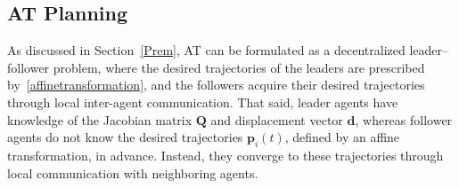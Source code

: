 \documentclass[journal]{IEEEtran}
\theoremstyle{definition}
\theoremstyle{plain}
\begin{document}
\subsection{AT Planning}\label{Affine Transformation Planning}
As discussed in Section~\ref{Prem}, AT can be formulated as a decentralized leader--follower problem, where the desired trajectories of the leaders are prescribed by~\eqref{affinetransformation}, and the followers acquire their desired trajectories through local inter-agent communication. That said, leader agents have knowledge of the Jacobian matrix 
$\mathbf{Q}$ and displacement vector
$\mathbf{d}$, whereas follower agents do not know the desired trajectories $\mathbf{p}_i(t)$, defined by an affine transformation, in advance. Instead, they converge to these trajectories through local communication with neighboring agents.
\end{document}
